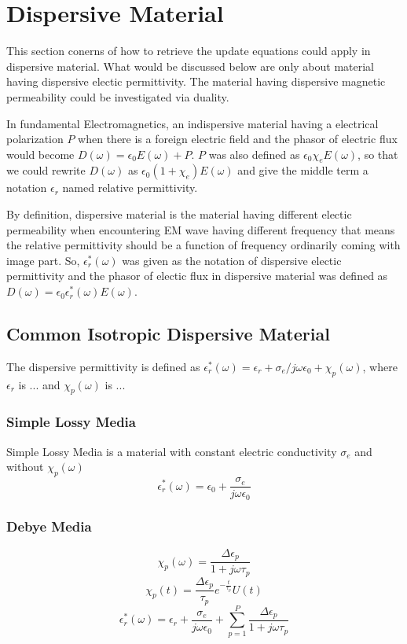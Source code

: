 \section{Dispersive Material}
\label{sec:dispersive}
This section conerns of how to retrieve the update equations could apply in dispersive material. What would be discussed
below are only about material having dispersive electic permittivity. The material having dispersive magnetic
permeability could be investigated via duality.

In fundamental Electromagnetics, an indispersive material having a electrical polarization $P$ when there is a foreign
electric field and the phasor of electric flux would become $D(\omega) = \epsilon_0 E(\omega) + P$. $P$ was also defined
as $\epsilon_0 \chi_e E(\omega)$, so that we could rewrite $D(\omega)$ as $\epsilon_0 (1+\chi_e)E(\omega)$ and give the middle term a notation
$\epsilon_r$ named relative permittivity.

By definition, dispersive material is the material having different electic permeability when encountering EM wave
having different frequency that means the relative permittivity should be a function of frequency ordinarily coming with
image part. So, $\epsilon_r^*(\omega)$ was given as the notation of dispersive electic permittivity and the phasor of
electic flux in dispersive material was defined as $D(\omega) = \epsilon_0 \epsilon_r^*(\omega)E(\omega)$.
\subsection{Common Isotropic Dispersive Material}
The dispersive permittivity is defined as $\epsilon_r^*(\omega) = \epsilon_r + \sigma_e / j\omega\epsilon_0 + \chi_p(\omega)$, where
$\epsilon_r$ is ... and $\chi_p(\omega)$ is ...
\subsubsection{Simple Lossy Media}
Simple Lossy Media is a material with constant electric conductivity $\sigma_e$ and without $\chi_p(\omega)$
\begin{equation}
  \epsilon_r^*(\omega) = \epsilon_0 + \frac{\sigma_e}{j\omega\epsilon_0}
\end{equation}

\subsubsection{Debye Media}
\begin{equation}
  \chi_p(\omega) = \frac{\Delta\epsilon_p}{1+j\omega\tau_p}  
\end{equation}
\begin{equation}
  \chi_p(t) = \frac{\Delta \epsilon_p}{\tau_p} e^{-\frac{t}{\tau_p}}U(t)  
\end{equation}
\begin{equation}
  \epsilon_r^*(\omega) = \epsilon_r + \frac{\sigma_e}{j\omega\epsilon_0} + \sum_{p=1}^P \frac{\Delta\epsilon_p}{1+j\omega\tau_p}  
\end{equation}



